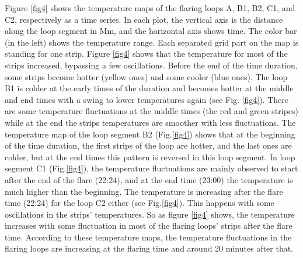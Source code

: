 \documentclass[oneside,onecolumn]{article}
\begin{document}
Figure \ref{fig4} shows the temperature maps of the flaring loops A, B1, B2, C1, and C2, respectively as a time series. In each plot, the vertical axis is the distance along the loop segment in Mm, and the horizontal axis shows time. The color bar (in the left) shows the temperature range. Each separated grid part on the map is standing for one strip. Figure \ref{fig4} shows that the temperature for most of the strips increased, bypassing a few oscillations. Before the end of the time duration, some strips become hotter (yellow ones) and some cooler (blue ones). The loop B1 is colder at the early times of the duration and becomes hotter at the middle and end times with a swing to lower temperatures again (see Fig. \ref{fig4}). There are some temperature fluctuations at the middle times (the red and green stripes) while at the end the strips temperatures are smoother with less fluctuations. The temperature map of the loop segment B2 (Fig.\ref{fig4}) shows that at the beginning of the time duration, the first strips of the loop are hotter, and the last ones are colder, but at the end times this pattern is reversed in this loop segment. In loop segment C1 (Fig.\ref{fig4}), the temperature fluctuations are mainly observed to start after the end of the flare (22:24), and at the end time (23:00) the temperature is much higher than the beginning. The temperature is increasing after the flare time (22:24) for the loop C2 either (see Fig.\ref{fig4}). This happens with some oscillations in the strips' temperatures. So as figure \ref{fig4} shows, the temperature increases with some fluctuation in most of the flaring loops' strips after the flare time. According to these temperature maps, the temperature fluctuations in the flaring loops are increasing at the flaring time and around 20 minutes after that. 
\end{document}
